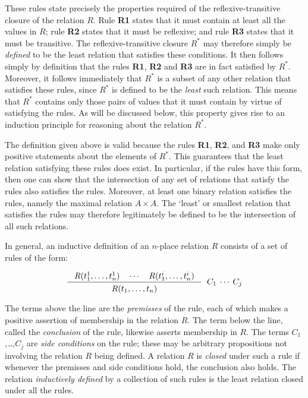 \documentclass[twocolumn,fleqn,layout]{article}
\begin{document}
\noindent These rules state precisely the properties required of the
reflexive-transitive closure of the relation $R$.  Rule {{\small\bf R}\bf 1}
states that it must contain at least all the values in $R$; rule {{\small\bf
R}\bf 2} states that it must be reflexive; and rule {{\small\bf R}\bf 3} states
that it must be transitive.  The reflexive-transitive closure $R^{*}$ may
therefore simply be {\it defined\/} to be the least relation that satisfies
these conditions.  It then follows simply by definition that the rules
{{\small\bf R}\bf 1}, {{\small\bf R}\bf 2} and {{\small\bf R}\bf 3} are in fact
satisfied by $R^{*}$.  Moreover, it follows immediately that $R^{*}$ is a
subset of any other relation that satisfies these rules, since $R^{*}$ is
defined to be the {\it least\/} such relation.  This means that $R^{*}$
contains only those pairs of values that it must contain by virtue of
satisfying the rules. As will be discussed below, this property gives rise to
an induction principle for reasoning about the relation $R^{*}$.

The definition given above is valid because the rules {{\small\bf R}\bf 1},
{{\small\bf R}\bf 2}, and {{\small\bf R}\bf 3} make only positive statements
about the elements of $R^{*}$.  This guarantees that the least relation
satisfying these rules does exist.  In particular, if the rules have this form,
then one can show that the intersection of any set of relations that satisfy
the rules also satisfies the rules.  Moreover, at least one binary relation
satisfies the rules, namely the maximal relation $A \times A$. The `least' or
smallest relation that satisfies the rules may therefore legitimately be
defined to be the intersection of all such relations.

In general, an inductive definition of an $n$-place \mbox{relation} $R$
consists of a set of rules of the form:

\smallskip

\[ \Rule{R(t_1^1,\dots,t_n^1) \quad \cdots \quad R(t_1^i,\dots,t_n^i)}
        {R(t_1,\dots,t_n)}\;\;C_1\:\cdots\:C_j \]

\smallskip

\noindent The terms above the line are the {\it premisses\/} of the rule, each
of which makes a positive assertion of membership in the relation $R$.  The
term below the line, called the {\it conclusion\/} of the rule, likewise
asserts membership in $R$. The terms $C_1$,\dots,$C_j$ are {\it side
conditions\/} on the rule; these may be arbitrary propositions not involving
the relation $R$ being defined. A relation $R$ is {\it closed\/} under such a
rule if whenever the premisses and side conditions hold, the conclusion also
holds.  The relation {\it inductively defined\/} by a collection of such rules
is the least relation closed under all the rules.
\end{document}
